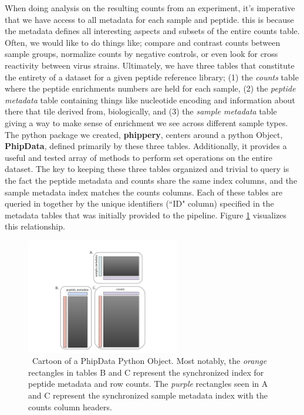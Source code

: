 \documentclass{article}
\begin{document}
When doing analysis on the resulting counts from an experiment, it's imperative that we have access to all metadata for each sample and peptide.
this is because the metadata defines all interesting aspects and subsets of the entire counts table.
Often, we would like to do things like; compare and contrast counts between sample groups, normalize counts by negative controls, or even look for cross reactivity between virus strains.
Ultimately, we have three tables that constitute the entirety of a dataset for a given peptide reference library;
(1) the \textit{counts} table where the peptide enrichments numbers are held for each sample,
(2) the \textit{peptide metadata} table containing things like nucleotide encoding and information about there that tile derived from, biologically, and
(3) the \textit{sample metadata} table giving a way to make sense of enrichment we see across different sample types.
The python package we created, \textbf{phippery}, centers around a python Object, \textbf{PhipData}, defined primarily by these three tables.
Additionally, it provides a useful and tested array of methods to perform set operations on the entire dataset.
The key to keeping these three tables organized and trivial to query is the fact the peptide metadata and counts share the same index columns,
and the sample metadata index matches the counts columns. 
Each of these tables are queried in together by the unique identifiers (``ID" column) specified in the metadata tables that was initially provided to the pipeline.
Figure \ref{fig:PhipData} visualizes this relationship.

\begin{figure}[h!!!!!!!]
\centering
\includegraphics[width=0.60\textwidth]{figures/PhipData_Object.pdf}
\caption{ \
Cartoon of a PhipData Python Object. 
Most notably, the \textit{orange} rectangles in tables B and C represent the synchronized index for peptide metadata and
row counts. The \textit{purple} rectangles seen in A and C represent the synchronized sample metadata index with the counts column headers.
}
\label{fig:PhipData}
\end{figure}
\end{document}
